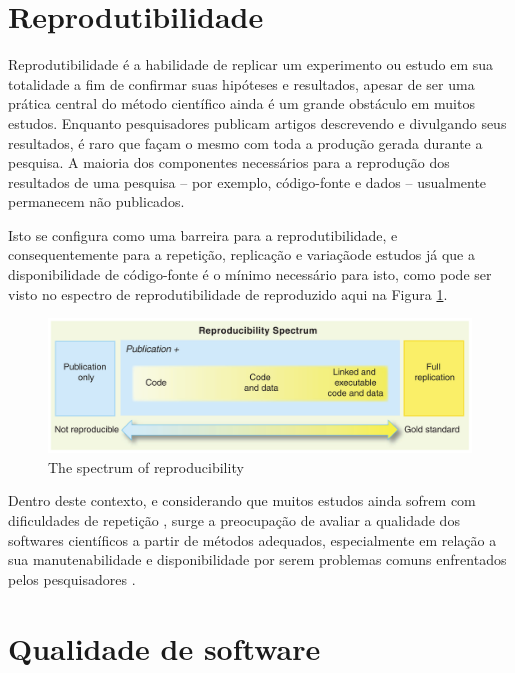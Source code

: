 \documentclass[qual, classic, a4paper]{ufbathesis}
\begin{document}
\section{Reprodutibilidade}

Reprodutibilidade é a habilidade de replicar um experimento ou estudo em sua
totalidade a fim de confirmar suas hipóteses e resultados, apesar de ser uma
prática central do método científico ainda é um grande obstáculo em muitos
estudos. Enquanto pesquisadores publicam artigos descrevendo e divulgando seus
resultados, é raro que façam o mesmo com toda a produção gerada durante a
pesquisa. A maioria dos componentes necessários para a reprodução dos
resultados de uma pesquisa -- por exemplo, código-fonte e dados -- usualmente
permanecem não publicados.

Isto se configura como uma barreira para a reprodutibilidade, e
consequentemente para a repetição, replicação e variaçãode estudos
\cite{Feitelson2015} já que a disponibilidade de código-fonte é o mínimo
necessário para isto, como pode ser visto no espectro de
reprodutibilidade de  reproduzido aqui na Figura
\ref{reproducibility-spectrum}.

\begin{figure}[h]
  \center
  \includegraphics[scale=0.25]{imagens/reproducibility-spectrum.png}
  \caption{The spectrum of reproducibility\cite{Peng2011}}
  \label{reproducibility-spectrum}
\end{figure}

Dentro deste contexto, e considerando que muitos estudos ainda sofrem com
dificuldades de repetição \cite{Tang2016}, surge a preocupação de avaliar a
qualidade dos softwares científicos a partir de métodos adequados,
especialmente em relação a sua manutenabilidade e disponibilidade por serem
problemas comuns enfrentados pelos pesquisadores \cite{Prlic2012}.

\section{Qualidade de software}
\end{document}

